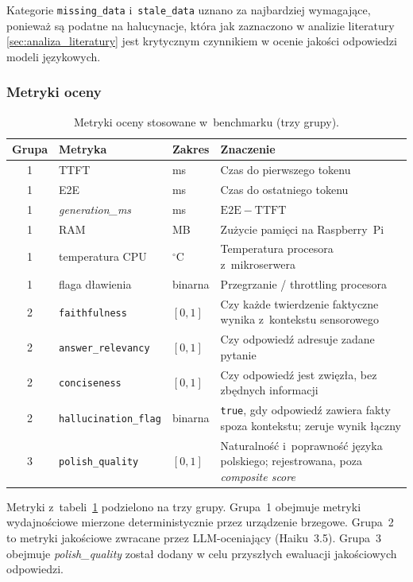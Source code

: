 Kategorie \texttt{missing\_data} i~\texttt{stale\_data} uznano za najbardziej wymagające,
ponieważ są podatne na halucynacje, która jak zaznaczono w analizie literatury \ref{sec:analiza_literatury} jest krytycznym czynnikiem w ocenie jakości odpowiedzi modeli językowych.

\subsubsection{Metryki oceny}
\label{subsec:metryki}

\begin{table}[H]
  \centering
  \caption{Metryki oceny stosowane w~benchmarku (trzy grupy).}
  \label{tab:haiku_metryki}
  \begin{tabular}{cllp{5.6cm}}
    \hline
    Grupa & Metryka & Zakres & Znaczenie \\
    \hline
    1 & TTFT & ms & Czas do pierwszego tokenu \\
    1 & E2E & ms & Czas do ostatniego tokenu \\
    1 & \emph{generation\_ms} & ms & $\mathrm{E2E}-\mathrm{TTFT}$ \\
    1 & RAM & MB & Zużycie pamięci na Raspberry~Pi \\
    1 & temperatura CPU & $^\circ$C & Temperatura procesora z~mikroserwera \\
    1 & flaga dławienia & binarna & Przegrzanie / throttling procesora \\
    \hline
    2 & \texttt{faithfulness} & $[0,1]$ & Czy każde twierdzenie faktyczne wynika z~kontekstu sensorowego \\
    2 & \texttt{answer\_relevancy} & $[0,1]$ & Czy odpowiedź adresuje zadane pytanie \\
    2 & \texttt{conciseness} & $[0,1]$ & Czy odpowiedź jest zwięzła, bez zbędnych informacji \\
    2 & \texttt{hallucination\_flag} & binarna & \texttt{true}, gdy odpowiedź zawiera fakty spoza kontekstu; zeruje wynik łączny \\
    \hline
    3 & \texttt{polish\_quality} & $[0,1]$ & Naturalność i~poprawność języka polskiego; rejestrowana, poza \emph{composite score} \\
    \hline
  \end{tabular}
\end{table}

Metryki z~tabeli~\ref{tab:haiku_metryki} podzielono na trzy grupy.
Grupa~1 obejmuje metryki wydajnościowe mierzone deterministycznie przez urządzenie brzegowe.
Grupa~2 to metryki jakościowe zwracane przez LLM-oceniający (Haiku~3.5).
Grupa~3 obejmuje \emph{polish\_quality} został dodany w celu przyszłych ewaluacji jakościowych odpowiedzi.


